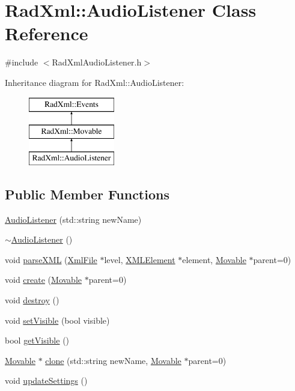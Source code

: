 \hypertarget{class_rad_xml_1_1_audio_listener}{\section{Rad\-Xml\-:\-:Audio\-Listener Class Reference}
\label{class_rad_xml_1_1_audio_listener}
}


{\ttfamily \#include $<$Rad\-Xml\-Audio\-Listener.\-h$>$}

Inheritance diagram for Rad\-Xml\-:\-:Audio\-Listener\-:\begin{figure}[H]
\begin{center}
\leavevmode
\includegraphics[height=3.000000cm]{class_rad_xml_1_1_audio_listener}
\end{center}
\end{figure}
\subsection*{Public Member Functions}
\begin{DoxyCompactItemize}
\item 
\hyperlink{class_rad_xml_1_1_audio_listener_a0ce679c273b8934d752d10cb714a518d}{Audio\-Listener} (std\-::string new\-Name)
\item 
\hyperlink{class_rad_xml_1_1_audio_listener_a0a0fd2fbb1270e0512bb46de65a547ce}{$\sim$\-Audio\-Listener} ()
\item 
void \hyperlink{class_rad_xml_1_1_audio_listener_ae5d8f9f424dd9ae96250e1d3c7a1ce19}{parse\-X\-M\-L} (\hyperlink{class_rad_xml_1_1_xml_file}{Xml\-File} $\ast$level, \hyperlink{class_x_m_l_element}{X\-M\-L\-Element} $\ast$element, \hyperlink{class_rad_xml_1_1_movable}{Movable} $\ast$parent=0)
\item 
void \hyperlink{class_rad_xml_1_1_audio_listener_a0df02d28aea5e28069cef826e715c5ac}{create} (\hyperlink{class_rad_xml_1_1_movable}{Movable} $\ast$parent=0)
\item 
void \hyperlink{class_rad_xml_1_1_audio_listener_ad7ea545d255d2634644bc937c3e75aee}{destroy} ()
\item 
void \hyperlink{class_rad_xml_1_1_audio_listener_ae77ed5f444abab71d5c6dc8dbecd3fac}{set\-Visible} (bool visible)
\item 
bool \hyperlink{class_rad_xml_1_1_audio_listener_ac5686288f4e2777ef4c9ec02fadab3de}{get\-Visible} ()
\item 
\hyperlink{class_rad_xml_1_1_movable}{Movable} $\ast$ \hyperlink{class_rad_xml_1_1_audio_listener_a885eed8e9e2b5ef41c1cefef996ba301}{clone} (std\-::string new\-Name, \hyperlink{class_rad_xml_1_1_movable}{Movable} $\ast$parent=0)
\item 
void \hyperlink{class_rad_xml_1_1_audio_listener_a8f4273c1d12b12d9eb26f2399648ad63}{update\-Settings} ()
\end{DoxyCompactItemize}
